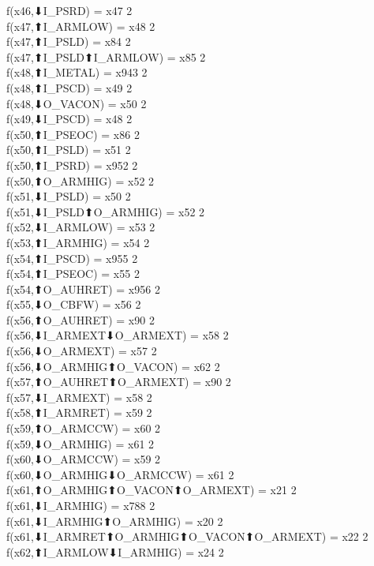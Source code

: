 f(x46,⬇I_PSRD) = x47 {2} \\
f(x47,⬆I_ARMLOW) = x48 {2} \\
f(x47,⬆I_PSLD) = x84 {2} \\
f(x47,⬆I_PSLD⬆I_ARMLOW) = x85 {2} \\
f(x48,⬆I_METAL) = x943 {2} \\
f(x48,⬆I_PSCD) = x49 {2} \\
f(x48,⬇O_VACON) = x50 {2} \\
f(x49,⬇I_PSCD) = x48 {2} \\
f(x50,⬆I_PSEOC) = x86 {2} \\
f(x50,⬆I_PSLD) = x51 {2} \\
f(x50,⬆I_PSRD) = x952 {2} \\
f(x50,⬆O_ARMHIG) = x52 {2} \\
f(x51,⬇I_PSLD) = x50 {2} \\
f(x51,⬇I_PSLD⬆O_ARMHIG) = x52 {2} \\
f(x52,⬇I_ARMLOW) = x53 {2} \\
f(x53,⬆I_ARMHIG) = x54 {2} \\
f(x54,⬆I_PSCD) = x955 {2} \\
f(x54,⬆I_PSEOC) = x55 {2} \\
f(x54,⬆O_AUHRET) = x956 {2} \\
f(x55,⬇O_CBFW) = x56 {2} \\
f(x56,⬆O_AUHRET) = x90 {2} \\
f(x56,⬇I_ARMEXT⬇O_ARMEXT) = x58 {2} \\
f(x56,⬇O_ARMEXT) = x57 {2} \\
f(x56,⬇O_ARMHIG⬆O_VACON) = x62 {2} \\
f(x57,⬆O_AUHRET⬆O_ARMEXT) = x90 {2} \\
f(x57,⬇I_ARMEXT) = x58 {2} \\
f(x58,⬆I_ARMRET) = x59 {2} \\
f(x59,⬆O_ARMCCW) = x60 {2} \\
f(x59,⬇O_ARMHIG) = x61 {2} \\
f(x60,⬇O_ARMCCW) = x59 {2} \\
f(x60,⬇O_ARMHIG⬇O_ARMCCW) = x61 {2} \\
f(x61,⬆O_ARMHIG⬆O_VACON⬆O_ARMEXT) = x21 {2} \\
f(x61,⬇I_ARMHIG) = x788 {2} \\
f(x61,⬇I_ARMHIG⬆O_ARMHIG) = x20 {2} \\
f(x61,⬇I_ARMRET⬆O_ARMHIG⬆O_VACON⬆O_ARMEXT) = x22 {2} \\
f(x62,⬆I_ARMLOW⬇I_ARMHIG) = x24 {2} \\
